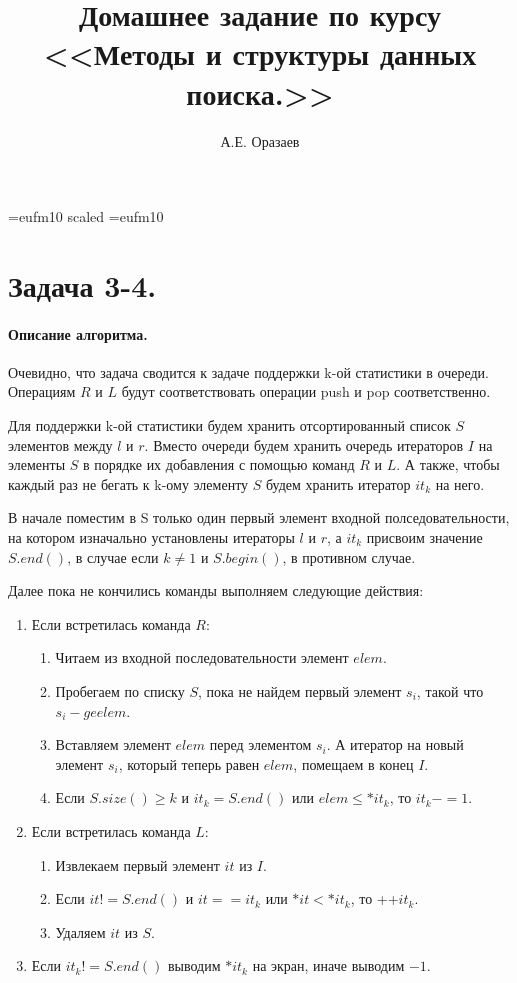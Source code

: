 \documentclass[12pt]{article}
\title{\bf Домашнее задание по курсу \\ <<Методы
и структуры данных поиска.>>}
\author{А.Е. Оразаев}
\date{}
\begin{document}
\voffset=-20mm
\hoffset=-12mm
\font\Got=eufm10 scaled \font\Got=eufm10

\maketitle

\section{Задача 3-4.}
\paragraph{Описание алгоритма.}
Очевидно, что задача сводится к задаче поддержки k-ой статистики в очереди.
Операциям $ R $ и $ L $ будут соответствовать операции push и pop
соответственно.

Для поддержки k-ой статистики будем хранить отсортированный список $ S $
элементов между $ l $ и $ r $. Вместо очереди будем хранить очередь
итераторов $ I $ на элементы $ S $ в порядке их добавления с помощью команд
$ R $ и $ L $. А также, чтобы каждый раз не бегать к k-ому элементу $ S $
будем хранить итератор $ it_k $ на него.

В начале поместим в S только один первый элемент входной полседовательности,
на котором изначально установлены итераторы $ l $ и $ r $, а $ it_k $
присвоим значение $ S.end() $, в случае если $ k \ne 1 $ и $ S.begin() $,
в противном случае.

Далее пока не кончились команды выполняем следующие действия:
\begin{enumerate}
    \item Если встретилась команда $ R $:
        \begin{enumerate}
            \item Читаем из входной последовательности элемент $ elem $.
            \item Пробегаем по списку $ S $, пока не найдем первый элемент
                  $ s_i $, такой что $ s_i -ge elem $.
            \item Вставляем элемент $ elem $ перед элементом $ s_i $. А
                  итератор на новый элемент $ s_i $, который теперь равен
                  $ elem $, помещаем в конец $ I $.
            \item Если $ S.size() \ge k $ и $ it_k = S.end() $ или
                  $ elem \le *it_k $, то $ it_k -= 1$.
        \end{enumerate}
    \item Если встретилась команда $ L $:
        \begin{enumerate}
            \item Извлекаем первый элемент $ it $ из $ I $.
            \item Если $ it != S.end() $ и $ it == it_k $ или
                  $ *it < *it_k $, то ++$ it_k $.
            \item Удаляем $ it $ из $ S $.
        \end{enumerate}
    \item Если $ it_k != S.end() $ выводим $ *it_k $ на экран, иначе
          выводим $ -1 $.
\end{enumerate}
\end{document}
